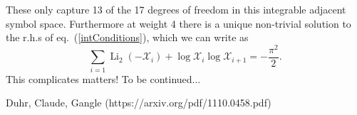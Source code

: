 \documentclass[12pt]{article}
\DeclareMathOperator{\Li}{Li}
\def\x{\mathcal{X}}
\begin{document}
These only capture 13 of the 17 degrees of freedom in this integrable adjacent symbol space. Furthermore at weight 4 there is a unique non-trivial solution to the r.h.s of eq.~(\ref{intConditions}), which we can write as
\begin{equation}
	\sum_{i=1} \Li_2(-\x_i)+\log\x_i\log\x_{i+1} = -\frac{\pi^2}{2}.
\end{equation}
This complicates matters! To be continued...
\begin{thebibliography}{xx}
	 Duhr, Claude, Gangle (https://arxiv.org/pdf/1110.0458.pdf)
\end{thebibliography}
\end{document}
